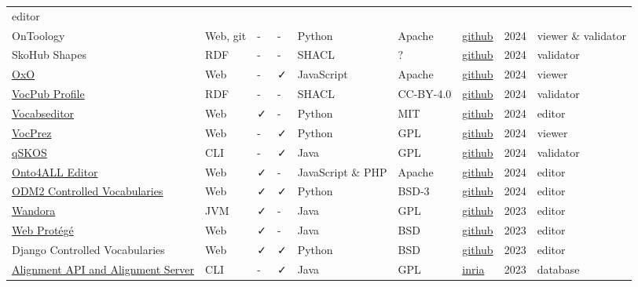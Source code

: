 \documentclass[
  DIV=10]{article}
\begin{document}
\begin{longtable}[]{@{}lllllllll@{}}
editor \\
OnToology & Web, git & - & - & Python & Apache &
\href{https://github.com/OnToology/OnToology}{github} & 2024 & viewer \&
validator \\
SkoHub Shapes & RDF & - & - & SHACL & ? &
\href{https://github.com/skohub-io/skohub-shapes}{github} & 2024 &
validator \\
\href{https://www.ebi.ac.uk/spot/oxo/}{OxO} & Web & - & ✓ & JavaScript &
Apache & \href{https://github.com/EBISPOT/OXO}{github} & 2024 &
viewer \\
\href{https://surroundaustralia.github.io/vocpub-profile/profile.html}{VocPub
Profile} & RDF & - & - & SHACL & CC-BY-4.0 &
\href{https://github.com/AGLDWG/vocpub-profile/}{github} & 2024 &
validator \\
\href{https://vocabseditor.acdh.oeaw.ac.at/}{Vocabseditor} & Web & ✓ & -
& Python & MIT &
\href{https://github.com/acdh-oeaw/vocabseditor}{github} & 2024 &
editor \\
\href{https://github.com/RDFLib/VocPrez}{VocPrez} & Web & - & ✓ & Python
& GPL & \href{https://github.com/RDFLib/VocPrez}{github} & 2024 &
viewer \\
\href{https://github.com/cmader/qSKOS/}{qSKOS} & CLI & - & ✓ & Java &
GPL & \href{https://github.com/cmader/qSKOS/}{github} & 2024 &
validator \\
\href{https://onto4all.com/}{Onto4ALL Editor} & Web & ✓ & - & JavaScript
\& PHP & Apache & \href{https://github.com/NCOR-BR/onto4all}{github} &
2024 & editor \\
\href{http://vocabulary.odm2.org/}{ODM2 Controlled Vocabularies} & Web &
✓ & ✓ & Python & BSD-3 &
\href{https://github.com/ODM2/ODM2ControlledVocabularies}{github} & 2024
& editor \\
\href{http://wandora.org/www/}{Wandora} & JVM & ✓ & - & Java & GPL &
\href{https://github.com/wandora-team/wandora}{github} & 2023 &
editor \\
\href{https://protegewiki.stanford.edu/wiki/WebProtege}{Web Protégé} &
Web & ✓ & - & Java & BSD &
\href{https://github.com/protegeproject/webprotege}{github} & 2023 &
editor \\
Django Controlled Vocabularies & Web & ✓ & ✓ & Python & BSD &
\href{https://github.com/unt-libraries/django-controlled-vocabularies}{github}
& 2023 & editor \\
\href{https://moex.gitlabpages.inria.fr/alignapi/}{Alignment API and
Alignment Server} & CLI & - & ✓ & Java & GPL &
\href{https://gitlab.inria.fr/moex/alignapi/}{inria} & 2023 &
database \\

\end{longtable}
\end{document}
